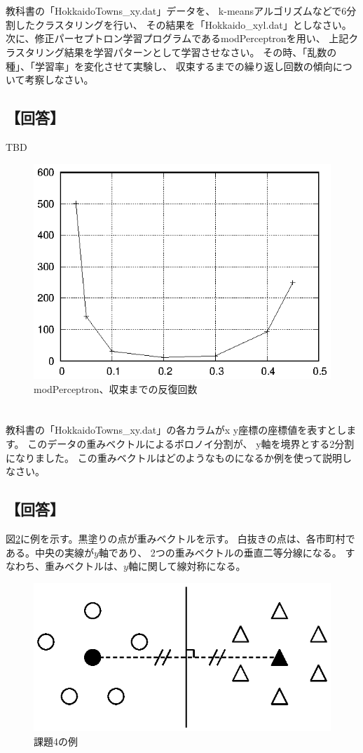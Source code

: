 \documentclass[a4j]{jarticle}
\begin{document}
\section{}
教科書の「HokkaidoTowns\_xy\@.dat」データを、
k-meansアルゴリズムなどで6分割したクラスタリングを行い、
その結果を「Hokkaido\_xyl\@.dat」としなさい。
次に、修正パーセプトロン学習プログラムであるmodPerceptronを用い、
上記クラスタリング結果を学習パターンとして学習させなさい。
その時、「乱数の種」、「学習率」を変化させて実験し、
収束するまでの繰り返し回数の傾向について考察しなさい。

\subsection{【回答】}
TBD

\begin{figure}[tbp]
 \begin{center}
  \includegraphics[width=0.5\hsize]{fig/modPerceptron.eps}
 \end{center}
 \caption{modPerceptron、収束までの反復回数}
 \label{fig:modPerceptron}
\end{figure}


\section{}
教科書の「HokkaidoTowns\_xy\@.dat」の各カラムがx y座標の座標値を表すとします。
このデータの重みベクトルによるボロノイ分割が、
y軸を境界とする2分割になりました。
この重みベクトルはどのようなものになるか例を使って説明しなさい。

\subsection{【回答】}
図\ref{fig:problem04}に例を示す。黒塗りの点が重みベクトルを示す。
白抜きの点は、各市町村である。中央の実線が$y$軸であり、
2つの重みベクトルの垂直二等分線になる。
すなわち、重みベクトルは、$y$軸に関して線対称になる。

\begin{figure}[tbp]
 \begin{center}
  \includegraphics[width=0.5\hsize]{fig/problem04.eps}
 \end{center}
 \caption{課題4の例}
 \label{fig:problem04}
\end{figure}
\end{document}
